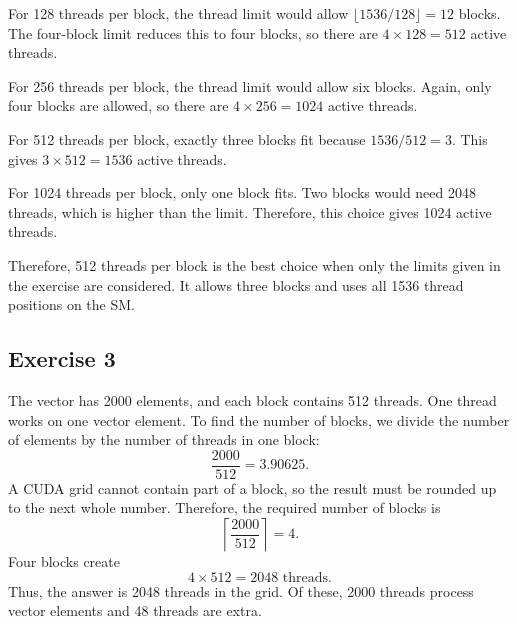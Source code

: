 \documentclass{report}
\begin{document}
For 128 threads per block, the thread limit would allow $\lfloor1536/128\rfloor=12$ blocks. The four-block limit reduces this to four blocks, so there are $4\times128=512$ active threads.

For 256 threads per block, the thread limit would allow six blocks. Again, only four blocks are allowed, so there are $4\times256=1024$ active threads.

For 512 threads per block, exactly three blocks fit because $1536/512=3$. This gives $3\times512=1536$ active threads.

For 1024 threads per block, only one block fits. Two blocks would need 2048 threads, which is higher than the limit. Therefore, this choice gives 1024 active threads.

Therefore, 512 threads per block is the best choice when only the limits given in the exercise are considered. It allows three blocks and uses all 1536 thread positions on the SM.

\subsection{Exercise 3}
The vector has 2000 elements, and each block contains 512 threads. One thread works on one vector element. To find the number of blocks, we divide the number of elements by the number of threads in one block:
\[
 \frac{2000}{512}=3.90625.
\]
A CUDA grid cannot contain part of a block, so the result must be rounded up to the next whole number. Therefore, the required number of blocks is
\[
 \left\lceil\frac{2000}{512}\right\rceil=4.
\]
Four blocks create
\[
 4\times512=2048\text{ threads}.
\]
Thus, the answer is 2048 threads in the grid. Of these, 2000 threads process vector elements and 48 threads are extra.
\end{document}
